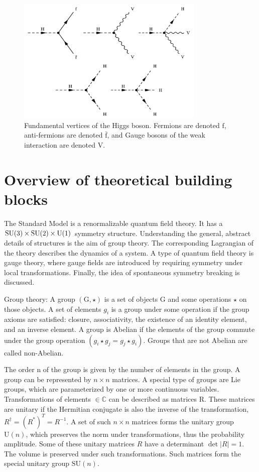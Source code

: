 \begin{figure}[htbp]
  \centering
  \includegraphics[width=0.8\textwidth]{plots/chapter2/h_vertices.png}
  \caption{Fundamental vertices of the Higgs boson. Fermions are denoted $\text{f}$, anti-fermions are denoted $\bar{\text{f}}$, and Gauge bosons of the weak interaction are denoted $\text{V}$.}
  \label{fig:h_vertices}
\end{figure}

\section{Overview of theoretical building blocks}
The Standard Model is a renormalizable quantum field theory. It has a $\text{SU}(3) \times \text{SU}(2) \times \text{U}(1)$ symmetry structure. Understanding the general, abstract details of structures is the aim of group theory. The corresponding Lagrangian of the theory describes the dynamics of a system. A type of quantum field theory is gauge theory, where gauge fields are introduced by requiring symmetry under local transformations. Finally, the idea of spontaneous symmetry breaking is discussed.

Group theory: A group $(\mathrm{G}, \star)$ is a set of objects G and some operations $\star$ on those objects. A set of elements $g_{i}$ is a group under some operation if the group axioms are satisfied: closure, associativity, the existence of an identity element, and an inverse element. A group is Abelian if the elements of the group commute under the group operation $(g_{i} \star g_{j}=g_{j} \star g_{i})$. Groups that are not Abelian are called non-Abelian.

The order n of the group is given by the number of elements in the group. A group can be represented by $n \times n$ matrices. A special type of groups are Lie groups, which are parameterized by one or more continuous variables. Transformations of elements $\in \mathbb{C}$ can be described as matrices R. These matrices are unitary if the Hermitian conjugate is also the inverse of the transformation, $R^{\dagger}=(R^{*})^{T}=R^{-1}$. A set of such $n \times n$ matrices forms the unitary group $\mathrm{U}(n)$, which preserves the norm under transformations, thus the probability amplitude. Some of these unitary matrices $R$ have a determinant $\operatorname{det}|R|=1$. The volume is preserved under such transformations. Such matrices form the special unitary group $\mathrm{SU}(n)$.

